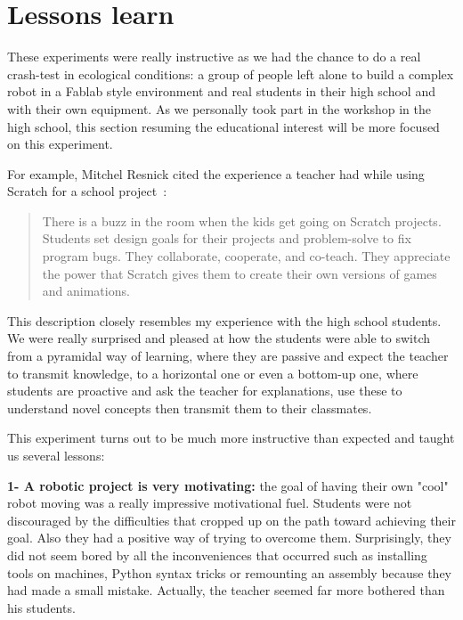 
\section{Lessons learn} %
\label{sec:education-lessons}

These experiments were really instructive as we had the chance to do a real crash-test in ecological conditions: a group of people left alone to build a complex robot in a Fablab style environment and real students in their high school and with their own equipment. As we personally took part in the workshop in the high school, this section resuming the educational interest will be more focused on this experiment.

For example, Mitchel Resnick cited the experience a teacher had while using Scratch for a school project~\cite{resnick2008sowing}:
\begin{quotation}
    There is a buzz in the room when the kids get going on Scratch projects. Students set design goals for their projects and problem-solve to fix program bugs. They collaborate, cooperate, and co-teach. They appreciate the power that Scratch gives them to create their own versions of games and animations.

\end{quotation}

This description closely resembles my experience with the high school students. We were really surprised and pleased at how the students were able to switch from a pyramidal way of learning, where they are passive and expect the teacher to transmit knowledge, to a horizontal one or even a bottom-up one, where students are proactive and ask the teacher for explanations, use these to understand novel concepts then transmit them to their classmates.

This experiment turns out to be much more instructive than expected and taught us several lessons:

\textbf{1- A robotic project is very motivating:} the goal of having their own "cool" robot moving was a really impressive motivational fuel. Students were not discouraged by the difficulties that cropped up on the path toward achieving their goal. Also they had a positive way of trying to overcome them. Surprisingly, they did not seem bored by all the inconveniences that occurred such as installing tools on machines, Python syntax tricks or remounting an assembly because they had made a small mistake. Actually, the teacher seemed far more bothered than his students.

